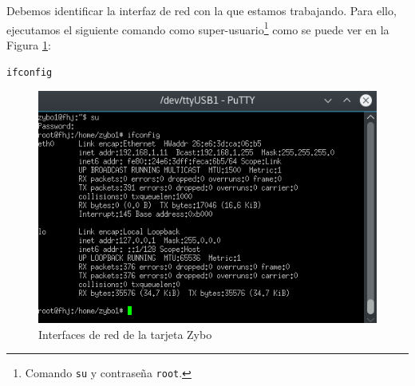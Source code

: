 \begin{itemize}
	Debemos identificar la interfaz de red con la que estamos trabajando. Para ello, ejecutamos el siguiente comando como super-usuario\footnote{Comando \texttt{su} y contraseña \texttt{root}.} como se puede ver en la Figura \ref{Interfaces de red de la tarjeta Zybo}:
	\begin{center}
		\texttt{ifconfig}
	\end{center}
	\newpage
	\begin{figure}[h]
		\centering
		\includegraphics[scale=0.8]{Anexos/Anexo2/Infraestructura/ifconfigZybo.png}
		\caption{Interfaces de red de la tarjeta Zybo}
		\label{Interfaces de red de la tarjeta Zybo}
	\end{figure}
	

\end{itemize}
